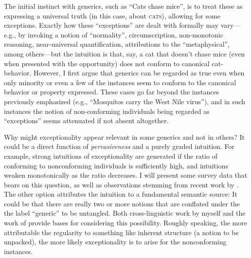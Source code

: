\documentclass[10pt,letterpaper]{article}
\begin{document}
The initial instinct with generics, such as ``Cats chase mice'', is to treat these as expressing a universal truth (in this case, about \textsc{cats}), allowing for some exceptions.
 Exactly how these ``exceptions'' are dealt with formally may vary---e.g., by invoking a notion of ``normality'', %
 circumscription, %
 non-monotonic reasoning, %
 near-universal quantification, %
 attributions to the ``metaphysical'', %
 among others---but the intuition is that, say, a cat that doesn't chase mice (even when presented with the opportunity) does not conform to canonical cat-behavior.  
However, I first argue that generics can be regarded as true even when only minority or even a few of the instances seem to conform to the canonical behavior or property expressed.  
These cases go far beyond the instances previously emphasized (e.g., ``Mosquitos carry the West Nile virus''), and in such instances the notion of non-conforming individuals being regarded as ``exceptions'' seems attenuated if not absent altogether.

Why might exceptionality appear relevant in some generics and not in others? 
It could be a direct function of \emph{pervasiveness} and a purely graded intuition.
For example, strong intuitions of exceptionality are generated if the ratio of conforming to nonconforming individuals is sufficiently high, and intuitions weaken monotonically as the ratio decreases.
I will present some survey data that bears on this question, as well as observations stemming from recent work by . 
The other option attributes the intuition to a fundamental semantic source: It could be that there are really two or more notions that are conflated under the the label ``generic'' to be untangled. 
Both cross-linguistic work by myself and the work of  provide bases for considering this possibility.  
Roughly speaking, the more attributable the regularity to something like inherent structure (a notion to be unpacked), the more likely exceptionality is to arise for the nonconforming instances.

\nocite{shepard1987}



\setlength{\bibleftmargin}{.125in}
\setlength{\bibindent}{-\bibleftmargin}
\vspace{-0.1cm}

\end{document}
